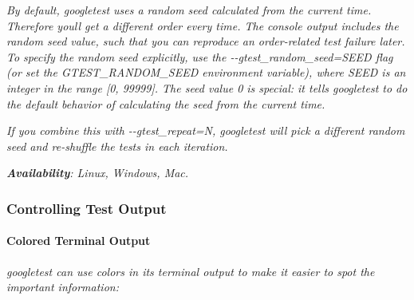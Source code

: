 {\itshape By default, googletest uses a random seed calculated from the current time. Therefore you\textquotesingle{}ll get a different order every time. The console output includes the random seed value, such that you can reproduce an order-\/related test failure later. To specify the random seed explicitly, use the {\ttfamily -\/-\/gtest\+\_\+random\+\_\+seed=S\+E\+ED} flag (or set the {\ttfamily G\+T\+E\+S\+T\+\_\+\+R\+A\+N\+D\+O\+M\+\_\+\+S\+E\+ED} environment variable), where {\ttfamily S\+E\+ED} is an integer in the range \mbox{[}0, 99999\mbox{]}. The seed value 0 is special\+: it tells googletest to do the default behavior of calculating the seed from the current time.}

{\itshape If you combine this with {\ttfamily -\/-\/gtest\+\_\+repeat=N}, googletest will pick a different random seed and re-\/shuffle the tests in each iteration.}

{\itshape {\bfseries Availability}\+: Linux, Windows, Mac.}

{\itshape \subsubsection*{Controlling Test Output}}

{\itshape }

{\itshape \paragraph*{Colored Terminal Output}}

{\itshape }

{\itshape googletest can use colors in its terminal output to make it easier to spot the important information\+:}

